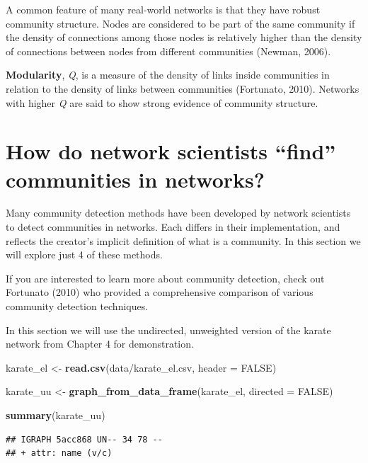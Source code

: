 \documentclass[
]{book}
\newenvironment{Shaded}{\begin{snugshade}}{\end{snugshade}}
\newcommand{\AttributeTok}[1]{\textcolor[rgb]{0.13,0.29,0.53}{#1}}
\newcommand{\ConstantTok}[1]{\textcolor[rgb]{0.56,0.35,0.01}{#1}}
\newcommand{\FunctionTok}[1]{\textcolor[rgb]{0.13,0.29,0.53}{\textbf{#1}}}
\newcommand{\NormalTok}[1]{#1}
\newcommand{\OtherTok}[1]{\textcolor[rgb]{0.56,0.35,0.01}{#1}}
\newcommand{\StringTok}[1]{\textcolor[rgb]{0.31,0.60,0.02}{#1}}
\begin{document}
A common feature of many real-world networks is that they have robust community structure. Nodes are considered to be part of the same community if the density of connections among those nodes is relatively higher than the density of connections between nodes from different communities (Newman, 2006).

\textbf{Modularity}, \emph{Q}, is a measure of the density of links inside communities in relation to the density of links between communities (Fortunato, 2010). Networks with higher \emph{Q} are said to show strong evidence of community structure.

\section{How do network scientists ``find'' communities in networks?}\label{how-do-network-scientists-find-communities-in-networks}

Many community detection methods have been developed by network scientists to detect communities in networks. Each differs in their implementation, and reflects the creator's implicit definition of what is a community. In this section we will explore just 4 of these methods.

If you are interested to learn more about community detection, check out Fortunato (2010) who provided a comprehensive comparison of various community detection techniques.

In this section we will use the undirected, unweighted version of the karate network from Chapter 4 for demonstration.

\begin{Shaded}
\begin{Highlighting}[]
\NormalTok{karate\_el }\OtherTok{\textless{}{-}} \FunctionTok{read.csv}\NormalTok{(}\StringTok{\textquotesingle{}data/karate\_el.csv\textquotesingle{}}\NormalTok{, }\AttributeTok{header =} \ConstantTok{FALSE}\NormalTok{)}

\NormalTok{karate\_uu }\OtherTok{\textless{}{-}} \FunctionTok{graph\_from\_data\_frame}\NormalTok{(karate\_el, }\AttributeTok{directed =} \ConstantTok{FALSE}\NormalTok{)}

\FunctionTok{summary}\NormalTok{(karate\_uu)}
\end{Highlighting}
\end{Shaded}

\begin{verbatim}
## IGRAPH 5acc868 UN-- 34 78 -- 
## + attr: name (v/c)
\end{verbatim}
\end{document}
